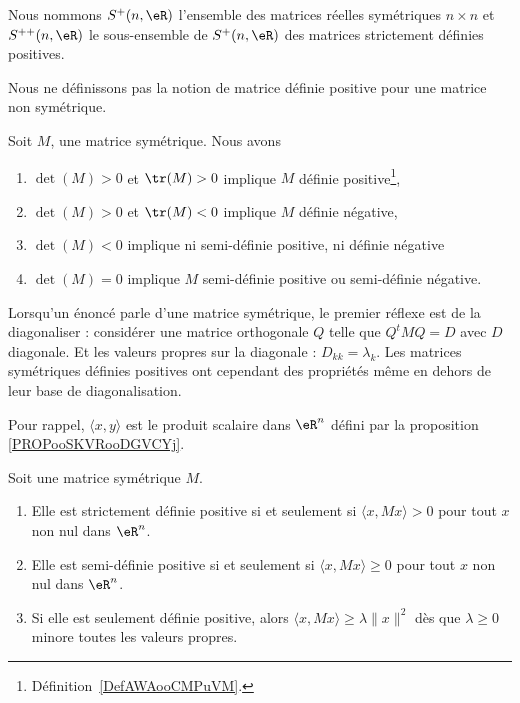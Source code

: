 \begin{normaltext}      \label{NORMooAJLHooQhwpvr}
	Nous nommons \( S^+(n,\eR)\) l'ensemble des matrices réelles symétriques \( n\times n\) et \( S^{++}(n,\eR)\) le sous-ensemble de \( S^+(n,\eR)\) des matrices strictement définies positives.
\end{normaltext}

\begin{remark}
	Nous ne définissons pas la notion de matrice définie positive pour une matrice non symétrique.
\end{remark}

\begin{proposition}     \label{PropcnJyXZ}
	Soit \( M\), une matrice symétrique. Nous avons
	\begin{enumerate}
		\item       \label{ITEMooTJVQooYmRkas}
		      \( \det(M)>0\) et \( \tr(M)>0\) implique \( M\) définie positive\footnote{Définition~\ref{DefAWAooCMPuVM}.},
		\item
		      \( \det(M)>0\) et \( \tr(M)<0\) implique \( M\) définie négative,
		\item       \label{ItemluuFPN}
		      \( \det(M)<0\) implique ni semi-définie positive, ni définie négative
		\item
		      \( \det(M)=0\) implique \( M\) semi-définie positive ou semi-définie négative.
	\end{enumerate}
\end{proposition}

Lorsqu'un énoncé parle d'une matrice symétrique, le premier réflexe est de la diagonaliser : considérer une matrice orthogonale \( Q\) telle que \( Q^tMQ=D\) avec \( D\) diagonale. Et les valeurs propres sur la diagonale : \( D_{kk}=\lambda_k\). Les matrices symétriques définies positives ont cependant des propriétés même en dehors de leur base de diagonalisation.

Pour rappel, \( \langle x, y\rangle \) est le produit scalaire dans \( \eR^n\) défini par la proposition \ref{PROPooSKVRooDGVCYj}.

\begin{lemma}   \label{LemWZFSooYvksjw}
	Soit une matrice symétrique \( M\).
	\begin{enumerate}
		\item       \label{ITEMooSKRAooOgHbGA}
		      Elle est strictement définie positive si et seulement si \( \langle x, Mx\rangle >0\) pour tout \( x\) non nul dans \( \eR^n\).
		\item       \label{ITEMooMOZYooWcrewZ}
		      Elle est semi-définie positive si et seulement si \( \langle x, Mx\rangle \geq 0\) pour tout \( x\) non nul dans \( \eR^n\).
		\item        \label{ITEMooRRMFooHSOHxZ}
		      Si elle est seulement définie positive, alors \( \langle x, Mx\rangle \geq \lambda\| x \|^2\) dès que \( \lambda\geq 0\) minore toutes les valeurs propres.
	\end{enumerate}
\end{lemma}

